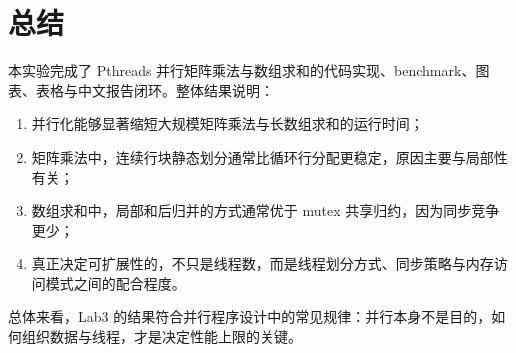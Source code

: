\documentclass[UTF8,a4paper,12pt,fontset=none]{ctexart}
\begin{document}
\section{总结}

本实验完成了 Pthreads 并行矩阵乘法与数组求和的代码实现、benchmark、图表、表格与中文报告闭环。整体结果说明：
\begin{enumerate}[leftmargin=2.2em]
  \item 并行化能够显著缩短大规模矩阵乘法与长数组求和的运行时间；
  \item 矩阵乘法中，连续行块静态划分通常比循环行分配更稳定，原因主要与局部性有关；
  \item 数组求和中，局部和后归并的方式通常优于 mutex 共享归约，因为同步竞争更少；
  \item 真正决定可扩展性的，不只是线程数，而是线程划分方式、同步策略与内存访问模式之间的配合程度。
\end{enumerate}

总体来看，Lab3 的结果符合并行程序设计中的常见规律：并行本身不是目的，如何组织数据与线程，才是决定性能上限的关键。
\end{document}
